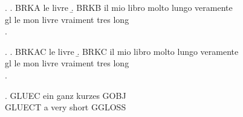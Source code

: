 \ex.
\a. BRKA le livre
\b. \gll BRKB il mio {libro molto lungo veramente} \\
         gl le {mon livre vraiment tres long}\\
\z.

\ex.
\a. BRKAC le livre
\b. \gll BRKC il mio {libro molto lungo veramente} \\
         gl le {mon livre vraiment tres long}\\
\z.

\ex. \gll GLUEC ein {ganz kurzes} GOBJ\\
          GLUECT a {very short} GGLOSS\\

